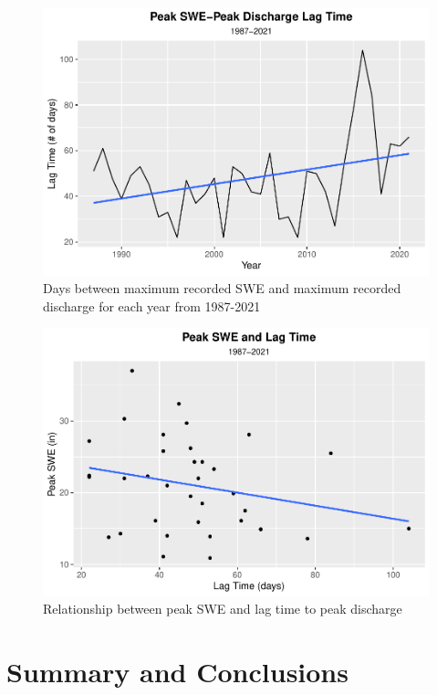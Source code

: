 \documentclass[
  12pt,
]{article}
\begin{document}
\begin{figure}
\centering
\includegraphics{McLaughlin_WDA_Project_files/figure-latex/unnamed-chunk-7-1.pdf}
\caption{Days between maximum recorded SWE and maximum recorded
discharge for each year from 1987-2021}
\end{figure}

\begin{figure}
\centering
\includegraphics{McLaughlin_WDA_Project_files/figure-latex/unnamed-chunk-8-1.pdf}
\caption{Relationship between peak SWE and lag time to peak discharge}
\end{figure}

\newpage

\hypertarget{summary-and-conclusions}{%
\section{Summary and Conclusions}\label{summary-and-conclusions}}
\end{document}
